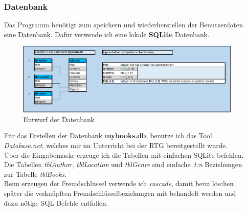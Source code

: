 \subsubsection{Datenbank}
Das Programm benötigt zum speichern und wiederherstellen der Benutzerdaten eine Datenbank.
Dafür verwende ich eine lokale \textbf{SQLite} Datenbank.\\
\begin{figure}[h]
\begin{center}
\includegraphics[width=15cm]{img/datenbank.png}
\caption{Entwurf der Datenbank}
\label{datenbank}
\end{center}
\end{figure}

Für das Erstellen der Datenbank \textbf{mybooks.db}, benutze ich das Tool \textit{Database.net}, welches mir im Unterricht bei der RTG bereitgestellt wurde.\\
Über die Eingabemaske erzeuge ich die Tabellen mit einfachen SQLite befehlen.
Die Tabellen \textit{tblAuthor, tblLocation} und \textit{tblGenre} sind einfache \textit{1:n} Beziehungen zur Tabelle \textit{tblBooks}.\\
Beim erzeugen der Fremdschlüssel verwende ich \textit{cascade}, damit beim löschen später die verknüpften Fremdschlüsselbeziehungen mit behandelt werden und dazu nötige SQL Befehle entfallen.\\
